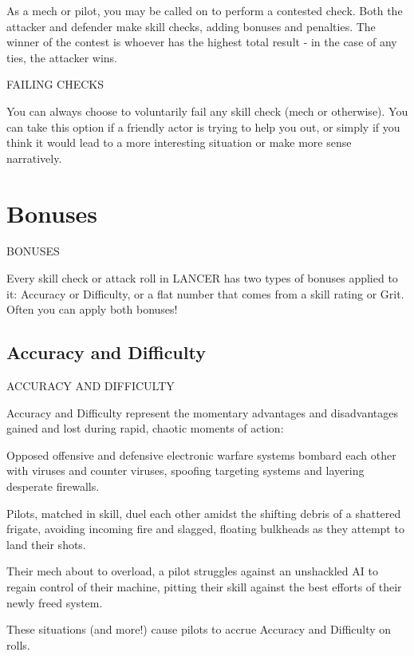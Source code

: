 As a mech or pilot, you may be called on to perform a contested check. Both the attacker and  
defender make skill checks, adding bonuses and penalties. The winner of the contest is whoever  
has the highest total result - in the case of any ties, the attacker wins.
 

                                             FAILING CHECKS  

You can always choose to voluntarily fail any skill check (mech or otherwise). You can take this  
option if a friendly actor is trying to help you out, or simply if you think it would lead to a more  
interesting situation or make more sense narratively.
 
\chapter{Bonuses}
   BONUSES  

Every skill check or attack roll in LANCER has two types of bonuses applied to it: Accuracy or  
Difficulty, or a flat number that comes from a skill rating or Grit. Often you can apply both bonuses!
 
\section{Accuracy and Difficulty}
                                ACCURACY AND DIFFICULTY  

Accuracy and Difficulty represent the momentary advantages and disadvantages gained and  
lost during rapid, chaotic moments of action:
 

Opposed offensive and defensive electronic warfare systems bombard each other with viruses  
and counter viruses, spoofing targeting systems and layering desperate firewalls.   

Pilots, matched in skill, duel each other amidst the shifting debris of a shattered frigate, avoiding  
incoming fire and slagged, floating bulkheads as they attempt to land their shots.   

Their mech about to overload, a pilot struggles against an unshackled AI to regain control of their  
machine, pitting their skill against the best efforts of their newly freed system.   

                                                                                                              


These situations (and more!) cause pilots to accrue Accuracy and Difficulty on rolls. 
 

